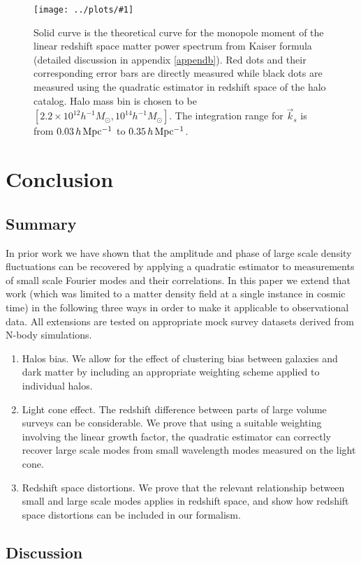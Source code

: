 \documentclass[prd,amsmath,amssymb,floatfix,superscriptaddress,nofootinbib,twocolumn]{revtex4-1}
\newcommand{\vk}{\vec{k}}
\newcommand{\sfig}[2]{
\texttt{[image: ../plots/\#1]}
        }
\newcommand{\Sfig}[2]{
   \begin{figure}[thbp]
   \begin{center}
    \sfig{../plots/#1.pdf}{\columnwidth}
    \caption{{\small #2}}
    \label{fig:#1}
     \end{center}
   \end{figure}
}
\begin{document}
\Sfig{SN_RS}{Solid curve is the theoretical curve for the monopole moment of the linear redshift space matter power spectrum from Kaiser formula (detailed discussion in appendix \ref{appendb}). Red dots and their corresponding error bars are directly measured while black dots are measured using the quadratic estimator in redshift space of the halo catalog. Halo mass bin is chosen to be $[2.2 \times 10^{12}h^{-1}M_{\odot},10^{14}h^{-1}M_{\odot}]$. The integration range for $\vk_s$ is from $0.03 \,h \,\rm Mpc^{-1}$ to $0.35\,h\,\rm Mpc^{-1}$.}

\section{Conclusion} \label{sec8}
\subsection{Summary}
In prior work \cite{Li:2020fir} we have shown that the amplitude and phase of large scale density fluctuations can be recovered by applying a quadratic estimator to measurements of small scale Fourier  modes and their correlations. In this paper we extend that work (which was limited to a matter density field at a single instance in cosmic time) in the following three ways in order to make it applicable to observational data. All extensions are tested on appropriate mock survey datasets derived from N-body simulations.

\begin{enumerate}
\item  Halos bias. We allow for the effect of clustering bias between galaxies and dark matter by including an appropriate weighting scheme applied to individual halos.

\item Light cone effect. The redshift difference between parts of large volume surveys can be considerable. We prove that using a suitable weighting involving the linear growth factor, the quadratic estimator can correctly recover large scale modes from small wavelength modes measured on the light cone.

\item Redshift space distortions. We prove that the relevant relationship between small and large scale modes applies in redshift space, and show how redshift space distortions can be included in our formalism.
\end{enumerate}
 
\subsection{Discussion}
\end{document}
